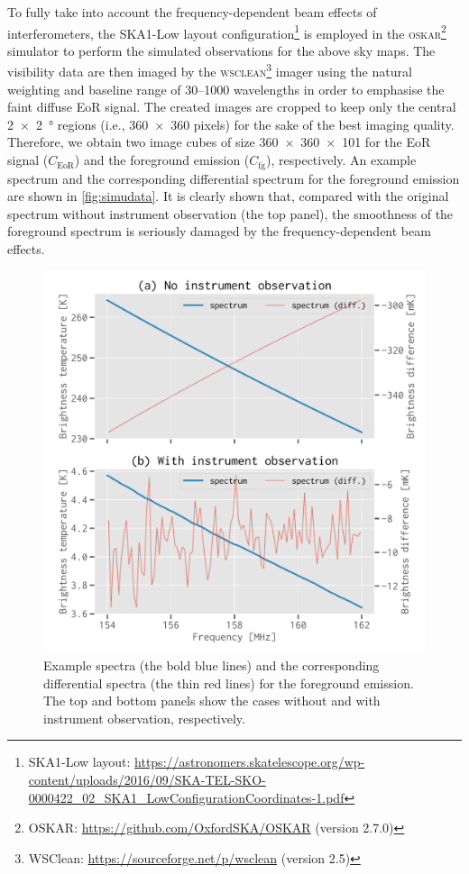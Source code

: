 \documentclass[letters,a4paper,fleqn,usenatbib]{mnras}
\newcommand{\R}[1]{\mathrm{#1}}
\begin{document}
To fully take into account the frequency-dependent beam effects of
interferometers, the SKA1-Low layout configuration\footnote{%
  SKA1-Low layout:
  \url{https://astronomers.skatelescope.org/wp-content/uploads/2016/09/SKA-TEL-SKO-0000422_02_SKA1_LowConfigurationCoordinates-1.pdf}}
is employed in the \textsc{oskar}\footnote{%
  OSKAR: \url{https://github.com/OxfordSKA/OSKAR} (version 2.7.0)}
simulator \citep{mort2010} to perform the simulated observations for the
above sky maps.
The visibility data are then imaged by the \textsc{wsclean}\footnote{%
  WSClean: \url{https://sourceforge.net/p/wsclean} (version 2.5)}
imager \citep{offringa2014} using the natural weighting and baseline
range of \numrange{30}{1000} wavelengths in order to emphasise the
faint diffuse EoR signal.
The created images are cropped to keep only the central
\SI{2 x 2}{\degree} regions (i.e., \num{360 x 360} pixels) for the sake
of the best imaging quality.
Therefore, we obtain two image cubes of size \num{360 x 360 x 101}
for the EoR signal ($C_{\R{EoR}}$) and the foreground emission
($C_{\R{fg}}$), respectively.
An example spectrum and the corresponding differential spectrum for
the foreground emission are shown in \autoref{fig:simudata}.
It is clearly shown that, compared with the original spectrum without
instrument observation (the top panel), the smoothness of the foreground
spectrum is seriously damaged by the frequency-dependent beam effects.

\begin{figure}
  \centering
  \includegraphics[width=\columnwidth]{simudata}
  \caption{\label{fig:simudata}%
    Example spectra (the bold blue lines) and the corresponding
    differential spectra (the thin red lines) for the foreground
    emission.
    The top and bottom panels show the cases without and with
    instrument observation, respectively.
  }
\end{figure}
\end{document}
